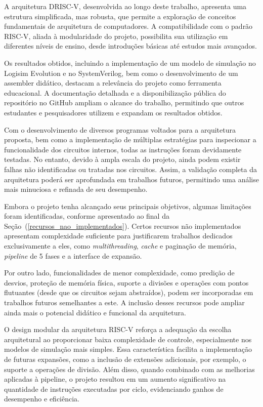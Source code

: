 \documentclass[
	12pt,				%
	openright,			%
	oneside,			%
	a4paper,			%
	english,			%
	french,				%
	spanish,			%
	brazil,				%
	]{abntex2}
\begin{document}
A arquitetura DRISC-V, desenvolvida ao longo deste trabalho, apresenta uma estrutura simplificada, mas robusta, que permite a exploração de conceitos fundamentais de arquitetura de computadores. A compatibilidade com o padrão RISC-V, aliada à modularidade do projeto, possibilita sua utilização em diferentes níveis de ensino, desde introduções básicas até estudos mais avançados.

Os resultados obtidos, incluindo a implementação de um modelo de simulação no Logisim Evolution e no SystemVerilog, bem como o desenvolvimento de um assembler didático, destacam a relevância do projeto como ferramenta educacional. A documentação detalhada e a disponibilização pública do repositório no GitHub ampliam o alcance do trabalho, permitindo que outros estudantes e pesquisadores utilizem e expandam os resultados obtidos.

Com o desenvolvimento de diversos programas voltados para a arquitetura proposta, bem como a implementação de múltiplas estratégias para inspecionar a funcionalidade dos circuitos internos, todas as instruções foram devidamente testadas. No entanto, devido à ampla escala do projeto, ainda podem existir falhas não identificadas ou tratadas nos circuitos. Assim, a validação completa da arquitetura poderá ser aprofundada em trabalhos futuros, permitindo uma análise mais minuciosa e refinada de seu desempenho.

Embora o projeto tenha alcançado seus principais objetivos, algumas limitações foram identificadas, conforme apresentado ao final da Seção~(\ref{recursos_nao_implementados}). Certos recursos não implementados apresentam complexidade suficiente para justificarem trabalhos dedicados exclusivamente a eles, como \textit{multithreading}, \textit{cache} e paginação de memória, \textit{pipeline} de 5 fases e a interface de expansão.

Por outro lado, funcionalidades de menor complexidade, como predição de desvios, proteção de memória física, suporte a divisões e operações com pontos flutuantes (desde que os circuitos sejam abstraídos), podem ser incorporadas em trabalhos futuros semelhantes a este. A inclusão desses recursos pode ampliar ainda mais o potencial didático e funcional da arquitetura.

O design modular da arquitetura RISC-V reforça a adequação da escolha arquitetural ao proporcionar baixa complexidade de controle, especialmente nos modelos de simulação mais simples. Essa característica facilita a implementação de futuras expansões, como a inclusão de extensões adicionais, por exemplo, o suporte a operações de divisão. Além disso, quando combinado com as melhorias aplicadas à pipeline, o projeto resultou em um aumento significativo na quantidade de instruções executadas por ciclo, evidenciando ganhos de desempenho e eficiência.
\end{document}
